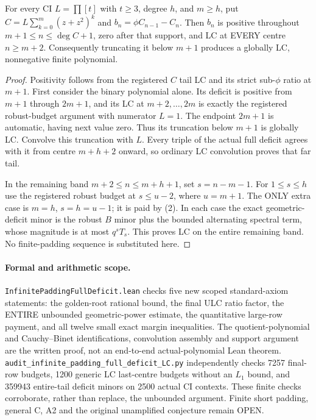 \begin{theorem}
For every CI $L=\prod[t]$ with $t\ge3$, degree $h$, and $m\ge h$,
put $C=L\sum_{k=0}^m(z+z^2)^k$ and $b_n=\phi C_{n-1}-C_n$.
Then $b_n$ is positive throughout $m+1\le n\le\deg C+1$,
zero after that support, and LC at EVERY centre $n\ge m+2$.
Consequently truncating it below $m+1$ produces a globally LC,
nonnegative finite polynomial.
\end{theorem}
\begin{proof}
Positivity follows from the registered $C$ tail LC and its strict
sub-$\phi$ ratio at $m+1$.
First consider the binary polynomial alone. Its deficit is positive
from $m+1$ through $2m+1$, and its LC at $m+2,\ldots,2m$
is exactly the registered robust-budget argument with numerator
$L=1$. The endpoint $2m+1$ is automatic, having next value zero.
Thus its truncation below $m+1$ is globally LC.
Convolve this truncation with $L$. Every triple of the actual full
deficit agrees with it from centre $m+h+2$ onward, so ordinary LC
convolution proves that far tail.

In the remaining band $m+2\le n\le m+h+1$, set $s=n-m-1$.
For $1\le s\le h$ use the registered robust budget at $s\le u-2$,
where $u=m+1$. The ONLY extra case is $m=h$, $s=h=u-1$;
it is paid by (2). In each case the exact geometric-deficit minor
is the robust $B$ minor plus the bounded alternating spectral term,
whose magnitude is at most $q^sT_s$. This proves LC on the entire
remaining band. No finite-padding sequence is substituted here.
\end{proof}

\paragraph{Formal and arithmetic scope.}
\texttt{InfinitePaddingFullDeficit.lean} checks five new scoped
standard-axiom statements: the golden-root rational bound, the final
ULC ratio factor, the ENTIRE unbounded geometric-power estimate,
the quantitative large-row payment, and all twelve small exact
margin inequalities. The quotient-polynomial and Cauchy--Binet
identifications, convolution assembly and support argument are the
written proof, not an end-to-end actual-polynomial Lean theorem.
\texttt{audit\_infinite\_padding\_full\_deficit\_LC.py} independently
checks 7257 final-row budgets, 1200 generic LC last-centre budgets
without an $L_1$ bound, and 359943 entire-tail deficit minors on
2500 actual CI contexts. These finite checks corroborate, rather
than replace, the unbounded argument. Finite short padding, general
C, A2 and the original unamplified conjecture remain OPEN.
